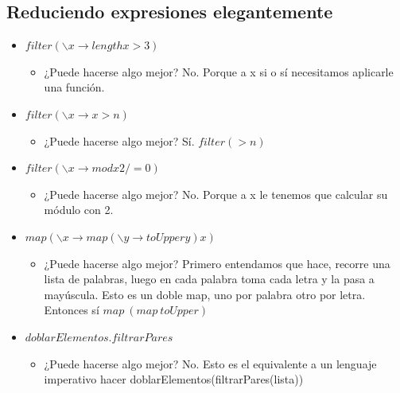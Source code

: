 \documentclass[10pt,a4paper]{article}
\begin{document}
\subsection*{Reduciendo expresiones elegantemente}
\begin{itemize}
    \item $filter(\backslash x \rightarrow length x > 3)$
    \begin{itemize}
        \item  ¿Puede hacerse algo mejor? No. Porque a x si o sí necesitamos aplicarle una función.
    \end{itemize}
    \item $filter(\backslash x \rightarrow x > n)$
    \begin{itemize}
        \item ¿Puede hacerse algo mejor? Sí. $filter (>n)$
    \end{itemize}
    \item $filter (\backslash x \rightarrow mod x 2 /= 0)$
    \begin{itemize}
        \item ¿Puede hacerse algo mejor? No. Porque a x le tenemos que calcular su módulo con 2.
    \end{itemize}
    \item $map(\backslash x \rightarrow map (\backslash y \rightarrow toUpper y) x)$
    \begin{itemize}
        \item ¿Puede hacerse algo mejor? Primero entendamos que hace, recorre una lista de palabras, luego en cada palabra toma cada letra y la pasa a mayúscula. Esto es un doble map, uno por palabra otro por letra. Entonces sí $map \ (map \ toUpper)$
    \end{itemize}
    \item $doblarElementos . filtrarPares$
    \begin{itemize}
        \item ¿Puede hacerse algo mejor? No. Esto es el equivalente a un lenguaje imperativo hacer doblarElementos(filtrarPares(lista))
    \end{itemize}

\end{itemize}
\end{document}
